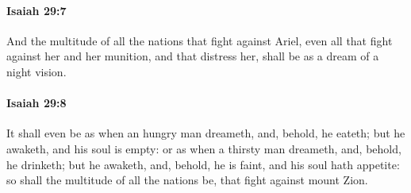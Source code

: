 		\paragraph{Isaiah 29:7} %
			\label{ISAIAH-29-7}

			And the multitude of all the nations that fight against Ariel, even all that fight against her and her munition, and that distress her, shall be as a dream of a night vision.


		\paragraph{Isaiah 29:8} %
			\label{ISAIAH-29-8}

			It shall even be as when an hungry man dreameth, and, behold, he eateth; but he awaketh, and his soul is empty: or as when a thirsty man dreameth, and, behold, he drinketh; but he awaketh, and, behold, he is faint, and his soul hath appetite: so shall the multitude of all the nations be, that fight against mount Zion.

